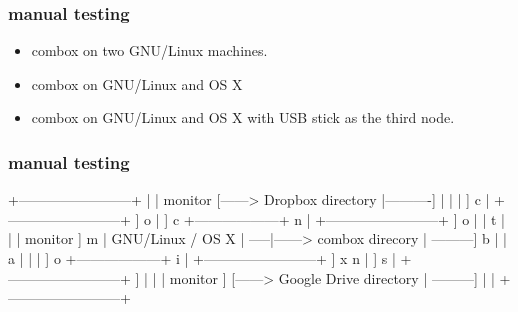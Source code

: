 \begin{frame}
  \frametitle{manual testing}
  \pause
  \begin{itemize}
  \item combox on two GNU/Linux machines.
  \item combox on GNU/Linux and OS X
  \item combox on GNU/Linux and OS X with USB stick as the third node.
  \end{itemize}
\end{frame}


\begin{frame}[fragile]
  \frametitle{manual testing}
  {\tiny
  \begin{semiverbatim}



                                   +------------------------+
                                   |                        | monitor
                            [------>   Dropbox directory    |----------]
                            |      |                        |          ]
                          c |      +------------------------+          ]
                          o |                                          ] c
  +------------------+    n |      +------------------------+          ] o
  |                  |    t |      |                        |  monitor ] m
  | GNU/Linux / OS X | -----|------>    combox direcory     | ---------] b
  |                  |    a |      |                        |          ] o
  +------------------+    i |      +------------------------+          ] x
                          n |                                          ]
                          s |      +------------------------+          ]
                            |      |                        |  monitor ]
                            [------> Google Drive directory | ---------]
                                   |                        |
                                   +------------------------+

  \end{semiverbatim} }
\end{frame}


